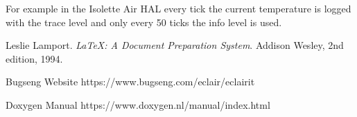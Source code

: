\documentclass[a4paper, 12pt]{article}
\begin{document}
For example in the Isolette Air HAL every tick the current temperature is logged with the trace level and only every 50 ticks the info level is used.

\begin{thebibliography}{9}
    Leslie Lamport.
    \textit{LaTeX: A Document Preparation System}.
    Addison Wesley, 2nd edition, 1994.

    Bugseng Website
    https://www.bugseng.com/eclair/eclairit

    Doxygen Manual
    https://www.doxygen.nl/manual/index.html

\end{thebibliography}
\end{document}
